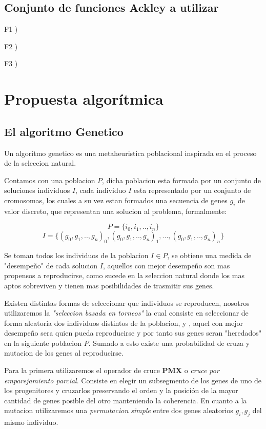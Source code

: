 \documentclass[10pt]{article}
\begin{document}
\subsection{Conjunto de funciones Ackley a utilizar}
F1 ) 

F2 ) 

F3 ) 

\section{Propuesta algorítmica} %

\subsection{El algoritmo Genetico}

Un algoritmo genetico es una metaheuristica poblacional inspirada en el proceso de la seleccion natural.

Contamos con una poblacion $P$, dicha poblacion esta formada por un conjunto de soluciones individuos $I$, cada individuo $I$ esta representado por un conjunto de cromosomas, los cuales a su vez estan formados una secuencia de genes $g_i$ de valor discreto, que representan una solucion al problema, formalmente:

$$P =\{i_0,i_1,..,i_n\}$$
$$I =\{(g_0,g_1,..,g_n)_0,(g_0,g_1,..,g_n)_1,...,(g_0,g_1,..,g_n)_n\}$$

Se toman todos los individuos de la poblacion $I \in P$, se obtiene una medida de "desempeño" de cada solucion $I$, aquellos con mejor desempeño son mas propensos a reproducirse, como sucede en la seleccion natural donde los mas aptos sobreviven y tienen mas posibilidades de trasmitir sus genes.

Existen distintas formas de seleccionar que individuos se reproducen, nosotros utilizaremos la \textit{"seleccion basada en torneos"} la cual consiste en seleccionar de forma aleatoria dos individuos distintos de la poblacion, y , aquel con mejor desempeño sera quien pueda reproducirse y por tanto sus genes seran "heredados" en la siguiente poblacion $P$. Sumado a esto existe una probabilidad de cruza y mutacion de los genes al reproducirse.

Para la primera utilizaremos el operador de cruce \textbf{PMX} o \textit{cruce por emparejamiento parcial}. Consiste en elegir un subsegmento de los genes de uno de los progenitores y cruzarlos preservando el orden y la posición de la mayor cantidad de genes posible del otro manteniendo la coherencia.
En cuanto a la mutacion utilizaremos una \textit{permutacion simple} entre dos genes aleatorios $g_i,g_j$ del mismo individuo.
\end{document}
